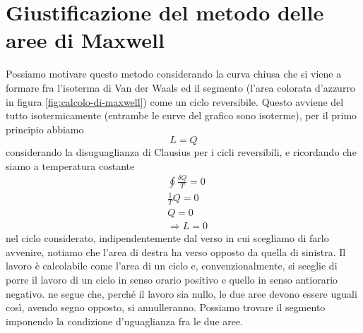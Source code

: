 \documentclass[
10pt, %
a4paper, %
oneside, %
headinclude,footinclude, %
BCOR5mm, %
]{scrartcl}
\begin{document}
\section{Giustificazione del metodo delle aree di Maxwell}
Possiamo motivare questo metodo considerando la curva chiusa che si viene a formare fra l'isoterma di Van der Waals ed il segmento (l'area colorata d'azzurro in figura \ref{fig:calcolo-di-maxwell}) come un ciclo reversibile. Questo avviene del tutto isotermicamente (entrambe le curve del grafico sono isoterme), per il primo principio abbiamo
\[L = Q\]
considerando la disuguaglianza di Clausius per i cicli reversibili, e ricordando che siamo a temperatura costante
\begin{align*}
	&\oint\frac{\delta Q}{T}= 0\\
	&\frac{1}{T}Q=0\\
	&Q=0\\
	&\Rightarrow L=0
\end{align*} 
nel ciclo considerato, indipendentemente dal verso in cui scegliamo di farlo avvenire, notiamo che l'area di destra ha verso opposto da quella di sinistra. Il lavoro è calcolabile come l'area di un ciclo e, convenzionalmente, si sceglie di porre il lavoro di un ciclo in senso orario positivo e quello in senso antiorario negativo. ne segue che, perché il lavoro sia nullo, le due aree devono essere uguali così, avendo segno opposto, si annulleranno. Possiamo trovare il segmento imponendo la condizione d'uguaglianza fra le due aree.  
\end{document}
